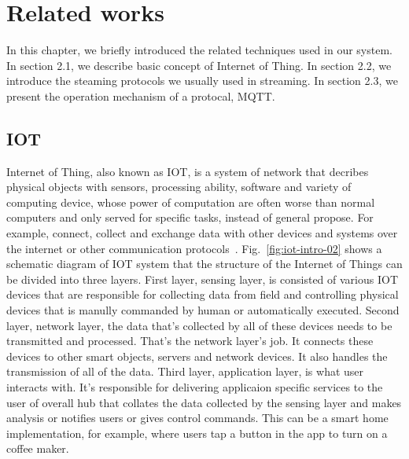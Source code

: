 

\chapter{Related works}
\label{c:related-works}

In this chapter, we briefly introduced the related techniques used in our system. In section 2.1, we describe basic concept of Internet of Thing. In section 2.2, we introduce the steaming protocols we usually used in streaming. In section 2.3, we present the operation mechanism of a protocal, MQTT.

\section{IOT}


\graphicspath{{./figsrc/}}
\fi

Internet of Thing, also known as IOT, is a system of network that decribes physical objects with sensors, processing ability, software and variety of computing device, whose power of computation are often worse than normal computers and only served for specific tasks, instead of general propose. For example, connect, collect and exchange data with other devices and systems over the internet or other communication protocols~\cite{iot-intro-01}. Fig.~\ref{fig:iot-intro-02} shows a schematic diagram of IOT system that the structure of the Internet of Things can be divided into three layers. First layer, sensing layer, is consisted of various IOT devices that are responsible for collecting data from field and controlling physical devices that is manully commanded by human or automatically executed. Second layer, network layer, the data that's collected by all of these devices needs to be transmitted and processed. That's the network layer's job. It connects these devices to other smart objects, servers and network devices. It also handles the transmission of all of the data. Third layer, application layer, is what user interacts with. It's responsible for delivering applicaion specific services to the user of overall hub that collates the data collected by the sensing layer and makes analysis or notifies users or gives control commands. This can be a smart home implementation, for example, where users tap a button in the app to turn on a coffee maker.

